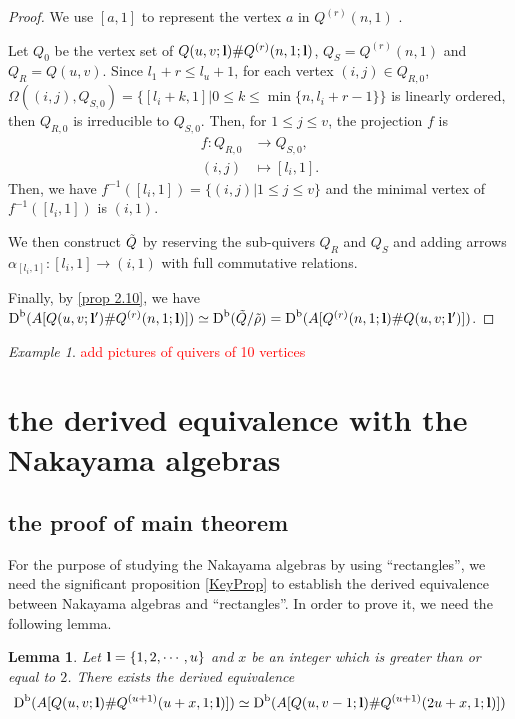 \documentclass[a4paper, reqno]{amsart}
\newtheorem{lem}[thm]{Lemma}
\theoremstyle{definition}
\theoremstyle{remark}
\newtheorem{exm}[thm]{Example}
\numberwithin{equation}{section}
\begin{document}
\begin{proof}
   We use $[a,1]$ to represent the vertex $a$ in $Q^{(r)}(n,1)$ .
   
   Let $Q_{0}$ be the vertex set of $ Q(u,v;{\bf{l}})\#Q^{(r)}(n,1;{\bf{l}}) $,  $ Q_{S} = Q^{(r)}(n,1)$ and $Q_{R} = Q(u,v)$. Since $l_1+r \leq l_u +1$, for each vertex $(i,j) \in Q_{R,0}$, $\Omega\left((i,j),Q_{S,0}\right) = \{ [l_i+k,1] | 0\leq k \leq \min\{n,l_{i}+r-1\} \}$ is linearly ordered, then  $Q_{R,0}$ is irreducible to $Q_{S,0}$. Then, for $1 \leq j \leq v$, the projection $f$ is 
   \begin{align*}
        f: Q_{R,0} &\to Q_{S,0},\\
        (i,j) &\mapsto [ l_i, 1 ]. 
    \end{align*}
   Then, we have $f^{-1}([ l_i, 1 ]) = \{(i,j)| 1 \leq j \leq v\} $ and the minimal vertex of $f^{-1}([ l_i, 1 ])$ is $(i,1)$.
   
   We then construct $ \Tilde{Q}$ by reserving the sub-quivers $Q_{R}$ and $Q_{S}$ and adding arrows $ \alpha_{[l_i,1]}: [l_i,1] \to (i,1)$  with full commutative relations. 
   
    Finally, by \ref{prop 2.10}, we have $\textup{D}^{\textup{b}}(A[Q(u,v;{\bf{l}}')\#Q^{(r)}(n,1;{\bf{l}})])
\simeq \textup{D}^{\textup{b}}(\Tilde{Q}/\Tilde{\rho}) = \textup{D}^{\textup{b}}
(A[Q^{(r)}(n,1;{\bf{l}})\#Q(u,v;{\bf{l}}')])$. 
\end{proof}

\begin{exm}
    \textcolor{red}{ add pictures of quivers of 10 vertices}
\end{exm}

\section{the derived equivalence with the Nakayama algebras}

\subsection{the proof of main theorem}
For the purpose of studying the Nakayama algebras by using ``rectangles'', we need
the significant proposition \ref{KeyProp} to establish the derived equivalence between Nakayama algebras and ``rectangles''. In order to prove it, we need the following lemma.

\begin{lem}\label{lem34}
Let ${\bf{l}}=\{1,2,\cdots,u\}$ and $x$ be an integer which is greater than or equal to $2$. There exists the derived equivalence
$$\textup{D}^{\textup{b}}(A[Q(u,v;{\bf{l}})\#Q^{(u+1)}(u+x,1;{\bf{l}})])\simeq\textup{D}^{\textup{b}}(A[Q(u,v-1;{\bf{l}})\#Q^{(u+1)}(2u+x,1;{\bf{l}})])$$
\end{lem}
\end{document}
